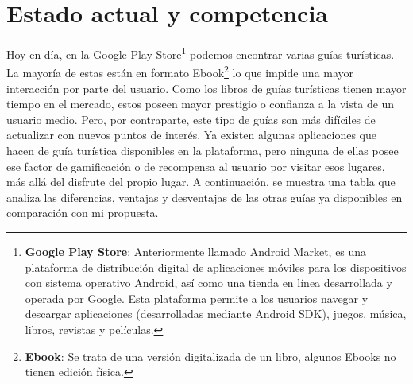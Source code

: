 \section{Estado actual y competencia}
Hoy en día, en la Google Play Store\footnote{\textbf{Google Play Store}:  Anteriormente llamado Android Market, es una plataforma de distribución digital de aplicaciones móviles para los dispositivos con sistema operativo Android, así como una tienda en línea desarrollada y operada por Google. Esta plataforma permite a los usuarios navegar y descargar aplicaciones (desarrolladas mediante Android SDK), juegos, música, libros, revistas y películas.} podemos encontrar varias guías turísticas. 
La mayoría de estas están en formato Ebook\footnote{\textbf{Ebook}: Se trata de una versión digitalizada de un libro, algunos Ebooks no tienen edición física.} lo que impide una mayor interacción por parte del usuario. Como los libros de guías turísticas tienen mayor tiempo en el mercado, estos poseen mayor prestigio o confianza a la vista de un usuario medio. Pero, por contraparte, este tipo de guías son más difíciles de actualizar con nuevos puntos de interés.
Ya existen algunas aplicaciones que hacen de guía turística disponibles en la plataforma, pero ninguna de ellas posee ese factor de gamificación o de recompensa al usuario por visitar esos lugares, más allá del disfrute del propio lugar. A continuación, se muestra una tabla que analiza las diferencias, ventajas y desventajas de las otras guías ya disponibles en comparación con mi propuesta.

